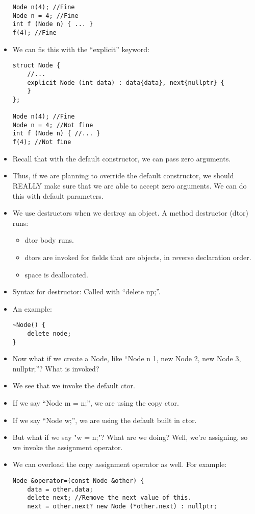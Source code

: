 \documentclass{article}
\begin{document}
\begin{itemize}
\begin{lstlisting}
Node n(4); //Fine
Node n = 4; //Fine
int f (Node n) { ... }
f(4); //Fine
\end{lstlisting}
\item We can fis this with the ``explicit'' keyword:
\begin{lstlisting}
struct Node {
    //...
    explicit Node (int data) : data{data}, next{nullptr} {
    }
};

Node n(4); //Fine
Node n = 4; //Not fine
int f (Node n) { //... }
f(4); //Not fine
\end{lstlisting}
\item Recall that with the default constructor, we can pass zero arguments.  
\item Thus, if we are planning to override the default constructor, we should REALLY make sure that we are able to accept zero arguments.  We can do this with default parameters.
\item We use destructors when we destroy an object.  A method destructor (dtor) runs:
\begin{itemize}
\item dtor body runs.
\item dtors are invoked for fields that are objects, in reverse declaration order.
\item space is deallocated.
\end{itemize}
\item Syntax for destructor: Called with ``delete np;''.
\item An example:
\begin{lstlisting}
~Node() {
    delete node;
}
\end{lstlisting}
\item Now what if we create a Node, like ``Node n {1, new Node {2, new Node {3, nullptr}}};''?  What is invoked?
\item We see that we invoke the default ctor.
\item If we say ``Node m = n;'', we are using the copy ctor.
\item If we say ``Node w;'', we are using the default built in ctor.
\item But what if we say "w = n;"?  What are we doing?  Well, we're assigning, so we invoke the assignment operator.  
\item We can overload the copy assignment operator as well.  For example:
\begin{lstlisting}
Node &operator=(const Node &other) {
    data = other.data;
    delete next; //Remove the next value of this.
    next = other.next? new Node (*other.next) : nullptr;

\end{lstlisting}
\end{itemize}
\end{document}
